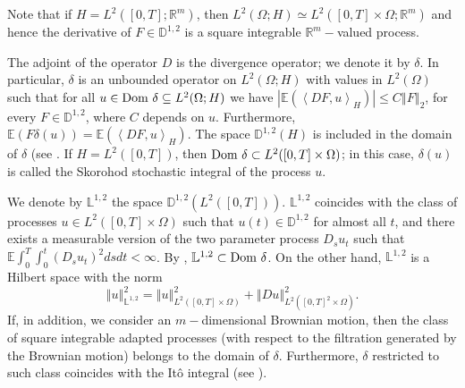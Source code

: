\documentclass[12,english]{amsart}
\theoremstyle{plain}
\theoremstyle{definition}
\theoremstyle{plain}
\theoremstyle{plain}
\theoremstyle{remark}
\newcommand{\E}{\mathbb E}
\newcommand{\D}{\mathbb D}
\newcommand{\R}{\mathbb R}
\newcommand{\mL}{\mathbb L}
\begin{document}
Note that if $H=L^2(\left[0,T\right];\R^m)$,
then $L^2(\Omega;H)\simeq L^2(\left[0,T\right]\times\Omega;\R^m)$
and hence the derivative of $F\in\D^{1,2}$ is a square integrable
$\R^m-$valued process. 

The adjoint of the operator $D$ is the divergence operator; we denote
it by $\delta$. In particular, $\delta$ is an unbounded operator
on $L^2(\Omega;H)$ with values in $L^2(\Omega)$
such that for all $u\in\hbox{Dom }\delta\subseteq L^2(\Omega;H)$
we have $\left|\E(\left\langle DF,u\right\rangle _H)\right|\leq C\left\Vert F\right\Vert _2$,
for every $F\in\D^{1,2}$, where $C$ depends on $u$. Furthermore,
$\E(F\delta(u))=\E(\left\langle DF,u\right\rangle _H)$.
The space $\D^{1,2}(H)$ is included in the domain
of $\delta$ (see \cite[Proposition 1.3.1]{nualart2006malliavin}.
If $H=L^2(\left[0,T\right])$, then $\hbox{Dom }\delta\subset L^2(\left[0,T\right]\times\Omega)$;
in this case, $\delta(u)$ is called the Skorohod stochastic
integral of the process $u$.

We denote by $\mL^{1,2}$ the space $\D^{1,2}(L^2(\left[0,T\right]))$.
$\mL^{1,2}$ coincides with the class of processes $u\in L^2(\left[0,T\right]\times\Omega)$
such that $u(t)\in\D^{1,2}$ for almost all $t$,
and there exists a measurable version of the two parameter process
$D_su_t$ such that $\E\int_0^T\int_0^t(D_su_t)^2dsdt<\infty$.
By \cite[Proposition 1.3.1]{nualart2006malliavin}, $\mL^{1,2}\subset\hbox{Dom }\delta$.
On the other hand, $\mL^{1,2}$ is a Hilbert space with the
norm
\[
\left\Vert u\right\Vert _{\mL^{1,2}}^2=\left\Vert u\right\Vert _{L^2(\left[0,T\right]\times\Omega)}^2+\left\Vert Du\right\Vert _{L^2(\left[0,T\right]^2\times\Omega)}^2.
\]
If, in addition, we consider an $m-$dimensional Brownian motion,
then the class of square integrable adapted processes (with respect
to the filtration generated by the Brownian motion) belongs to the
domain of $\delta$. Furthermore, $\delta$ restricted to such class
coincides with the It\^{o} integral (see \cite[Proposition 1.3.11]{nualart2006malliavin}).
\end{document}
